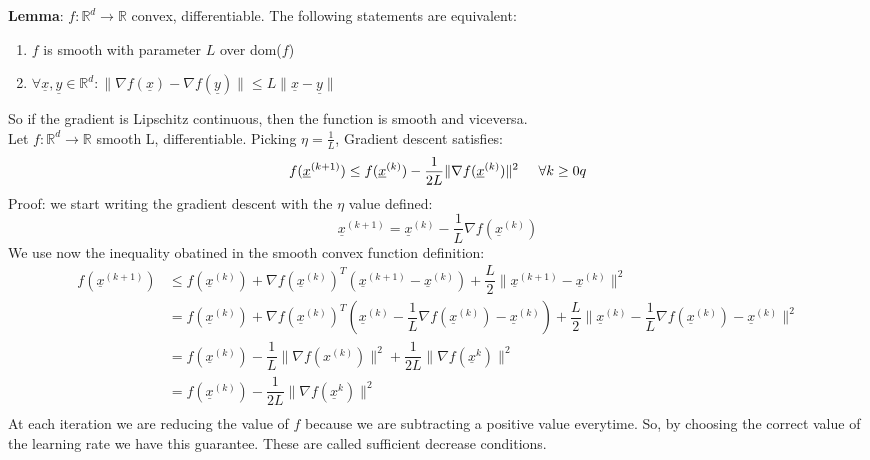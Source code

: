 \textbf{Lemma}: $f: \mathbb{R}^d \to \mathbb{R}$ convex, differentiable. The following statements are equivalent:
\begin{enumerate}
    \item $f$ is smooth with parameter $L$ over dom($f$)
    \item $\forall \underline{x}, \underline{y} \in \mathbb{R}^d: \|\nabla f(\underline{x}) - \nabla f(\underline{y})\| \leq L\|\underline{x} - \underline{y}\|$
\end{enumerate}
So if the gradient is Lipschitz continuous, then the function is smooth and viceversa.\\

Let $f: \mathbb{R}^d \to \mathbb{R}$ smooth L, differentiable. Picking $\eta = \frac{1}{L}$, Gradient descent satisfies:
\[
    f(\underline{x}^{(k+1)}) \leq f(\underline{x}^{(k)}) - \dfrac{1}{2L}\|\nabla f(\underline{x}^{(k)})\|^2 \hspace{0.5cm} \forall k \geq 0q    
\]
Proof: we start writing the gradient descent with the $\eta$ value defined:
\[
    \underline{x}^{(k+1)} = \underline{x}^{(k)} - \dfrac{1}{L}\nabla f(\underline{x}^{(k)})    
\]
We use now the inequality obatined in the smooth convex function definition:
\[
    \begin{split}
        f(\underline{x}^{(k+1)}) &\leq f(\underline{x}^{(k)}) + \nabla f(\underline{x}^{(k)})^T(\underline{x}^{(k+1)}-\underline{x}^{(k)}) + \dfrac{L}{2}\|\underline{x}^{(k+1)}-\underline{x}^{(k)}\|^2 \\
        &= f(\underline{x}^{(k)}) + \nabla f(\underline{x}^{(k)})^T\left(\underline{x}^{(k)} - \dfrac{1}{L}\nabla f(\underline{x}^{(k)})-\underline{x}^{(k)}\right)+ \dfrac{L}{2}\|\underline{x}^{(k)} - \dfrac{1}{L}\nabla f(\underline{x}^{(k)})-\underline{x}^{(k)}\|^2\\
        &= f(\underline{x}^{(k)}) - \dfrac{1}{L} \|\nabla f(x^{(k)})\|^2 + \dfrac{1}{2L} \|\nabla f(\underline{x}^{k})\|^2\\
        &= f(\underline{x}^{(k)}) - \dfrac{1}{2L} \|\nabla f(\underline{x}^{k})\|^2\\
    \end{split}
\]
At each iteration we are reducing the value of $f$ because we are subtracting a positive value everytime. So, by choosing the correct value of the learning rate we have this guarantee. These are called sufficient decrease conditions.\\

